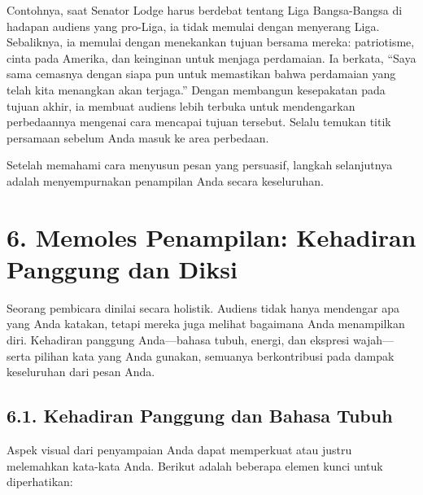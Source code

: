 \documentclass[
  letterpaper,
  DIV=11,
  numbers=noendperiod]{scrreprt}
\begin{document}
Contohnya, saat Senator Lodge harus berdebat tentang Liga Bangsa-Bangsa
di hadapan audiens yang pro-Liga, ia tidak memulai dengan menyerang
Liga. Sebaliknya, ia memulai dengan menekankan tujuan bersama mereka:
patriotisme, cinta pada Amerika, dan keinginan untuk menjaga perdamaian.
Ia berkata, ``Saya sama cemasnya dengan siapa pun untuk memastikan bahwa
perdamaian yang telah kita menangkan akan terjaga.'' Dengan membangun
kesepakatan pada tujuan akhir, ia membuat audiens lebih terbuka untuk
mendengarkan perbedaannya mengenai cara mencapai tujuan tersebut. Selalu
temukan titik persamaan sebelum Anda masuk ke area perbedaan.

Setelah memahami cara menyusun pesan yang persuasif, langkah selanjutnya
adalah menyempurnakan penampilan Anda secara keseluruhan.


\chapter{6. Memoles Penampilan: Kehadiran Panggung dan
Diksi}\label{memoles-penampilan-kehadiran-panggung-dan-diksi}

Seorang pembicara dinilai secara holistik. Audiens tidak hanya mendengar
apa yang Anda katakan, tetapi mereka juga melihat bagaimana Anda
menampilkan diri. Kehadiran panggung Anda---bahasa tubuh, energi, dan
ekspresi wajah---serta pilihan kata yang Anda gunakan, semuanya
berkontribusi pada dampak keseluruhan dari pesan Anda.

\section{\texorpdfstring{\textbf{6.1. Kehadiran Panggung dan Bahasa
Tubuh}}{6.1. Kehadiran Panggung dan Bahasa Tubuh}}\label{kehadiran-panggung-dan-bahasa-tubuh}

Aspek visual dari penyampaian Anda dapat memperkuat atau justru
melemahkan kata-kata Anda. Berikut adalah beberapa elemen kunci untuk
diperhatikan:
\end{document}
